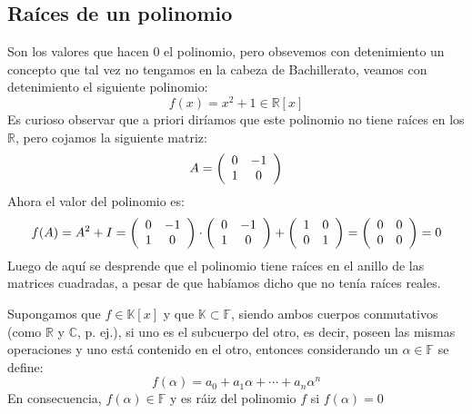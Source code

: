\documentclass[10pt,a4paper,openright]{book}
\theoremstyle{break}
\begin{document}
\subsection{Raíces de un polinomio}
Son los valores que hacen 0 el polinomio, pero obsevemos con detenimiento un concepto que tal vez no tengamos en la cabeza de Bachillerato, veamos con detenimiento el siguiente polinomio:
$$f(x)=x^2+1\in \mathbb R[x]$$
Es curioso observar que a priori diríamos que este polinomio no tiene raíces en los $\mathbb R$, pero cojamos la siguiente matriz:
$$A=\left( 
\begin{array}{*2c}
0 & -1 \\
1 & 0 \\
\end{array}
\right)
$$
Ahora el valor del polinomio es:
$$f(A)=A^2+I=\left(\begin{array}{*2c}0 & -1 \\ 1 & 0 \\ \end{array}\right)\cdot \left(\begin{array}{*2c}0 & -1 \\ 1 & 0 \\ \end{array}\right) + \left(\begin{array}{*2c}1 & 0 \\ 0 & 1 \\ \end{array}\right)= \left(\begin{array}{*2c}0 & 0 \\ 0 & 0 \\ \end{array}\right)=0$$
Luego de aquí se desprende que el polinomio tiene raíces en el anillo de las matrices cuadradas, a pesar de que habíamos dicho que no tenía raíces reales.\par
Supongamos que $f\in\mathbb K[x]$ y que $\mathbb K \subset \mathbb F$, siendo ambos cuerpos conmutativos (como $\mathbb R$ y $\mathbb C$, p. ej.), si uno es el subcuerpo del otro, es decir, poseen las mismas operaciones y uno está contenido en el otro, entonces considerando un $\alpha\in \mathbb F$ se define:
$$f(\alpha)=a_0+a_1\alpha+\cdots+a_n\alpha^n$$
En consecuencia, $f(\alpha)\in \mathbb F$ y es ráiz del polinomio $f$ si $f(\alpha)=0$
\end{document}

